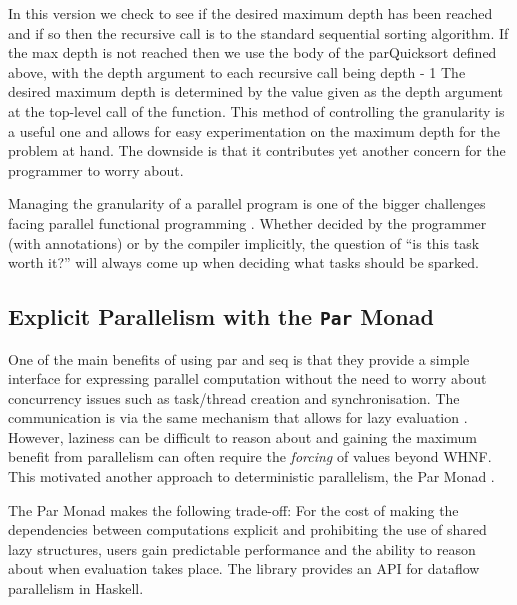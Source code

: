     In this version we check to see if the desired maximum depth has been
reached and if so then the recursive call is to the standard sequential sorting
algorithm. If the max depth is not reached then we use the body of the
parQuicksort defined above, with the depth argument to each recursive call being
\<depth - 1\> The desired maximum depth is determined by the value given as
the depth argument at the top-level call of the function. This method of
controlling the granularity is a useful one and allows for easy experimentation
on the maximum depth for the problem at hand. The downside is that it
contributes yet another concern for the programmer to worry about.


Managing the granularity of a parallel program is one of the bigger challenges
facing parallel functional programming \citep{SPJ:PIFPL}. Whether decided by
the programmer (with annotations) or by the compiler implicitly, the question
of ``is this task worth it?'' will always come up when deciding what tasks
should be sparked.


\subsection{Explicit Parallelism with the \texttt{Par} Monad}

One of the main benefits of using \<par\> and \<seq\> is that they
provide a simple interface for expressing parallel computation without
the need to worry about concurrency issues such as task/thread creation
and synchronisation. The communication is via the same mechanism that
allows for lazy evaluation \citep{SPJ:PIFPL}. However, laziness can
be difficult to reason about and gaining the maximum benefit from parallelism
can often require the \emph{forcing} of values beyond WHNF. 
This motivated another approach to deterministic parallelism, the \<Par\>
Monad \citep{marlow2011monad}.

The \<Par\> Monad makes the following trade-off: For the cost of making the
dependencies between computations explicit and prohibiting the use of shared
lazy structures, users gain predictable performance and the ability to reason
about when evaluation takes place. The library provides an API for dataflow
parallelism in Haskell.


